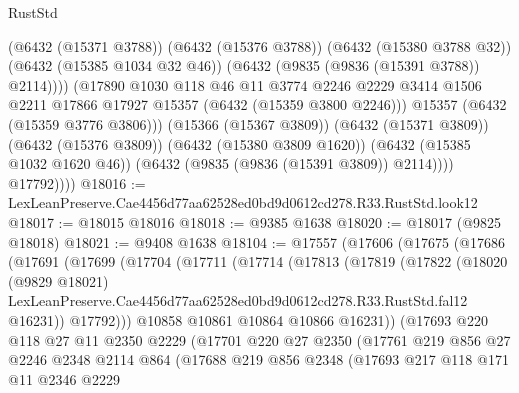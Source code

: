 \begin{lexlean}{RustStd}
\begin{coremodule}
                      (@6432 (@15371 @3788))
                      (@6432 (@15376 @3788))
                      (@6432 (@15380 @3788 @32))
                      (@6432 (@15385 @1034 @32 @46))
                      (@6432 (@9835 (@9836 (@15391 @3788)) @2114))))
                  (@17890
                    @1030
                    @118
                    @46
                    @11
                    @3774
                    @2246
                    @2229
                    @3414
                    @1506
                    @2211
                    @17866
                    @17927
                    @15357
                    (@6432 (@15359 @3800 @2246)))
                  @15357
                  (@6432 (@15359 @3776 @3806)))
                (@15366 (@15367 @3809))
                (@6432 (@15371 @3809))
                (@6432 (@15376 @3809))
                (@6432 (@15380 @3809 @1620))
                (@6432 (@15385 @1032 @1620 @46))
                (@6432 (@9835 (@9836 (@15391 @3809)) @2114))))
            @17792))))
@18016 := LexLeanPreserve.Cae4456d77aa62528ed0bd9d0612cd278.R33.RustStd.look12
@18017 := @18015 @18016
@18018 := @9385 @1638
@18020 := @18017 (@9825 @18018)
@18021 := @9408 @1638
@18104 := @17557
    (@17606
      (@17675
        (@17686
          (@17691
            (@17699
              (@17704
                (@17711
                  (@17714
                    (@17813
                      (@17819
                        (@17822
                          (@18020
                            (@9829 @18021)
                            LexLeanPreserve.Cae4456d77aa62528ed0bd9d0612cd278.R33.RustStd.fal12
                            @16231))
                        @17792)))
                  @10858
                  @10861
                  @10864
                  @10866
                  @16231))
              (@17693
                @220
                @118
                @27
                @11
                @2350
                @2229
                (@17701
                  @220
                  @27
                  @2350
                  (@17761
                    @219
                    @856
                    @27
                    @2246
                    @2348
                    @2114
                    @864
                    (@17688
                      @219
                      @856
                      @2348
                      (@17693
                        @217
                        @118
                        @171
                        @11
                        @2346
                        @2229

\end{coremodule}
\end{lexlean}
